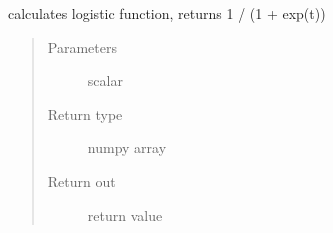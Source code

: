 \documentclass[letterpaper,10pt,english]{sphinxmanual}
\begin{document}

\begin{fulllineitems}
\label{\detokenize{regression:regression.phi}}
calculates logistic function, returns 1 / (1 + exp(\sphinxhyphen{}t))
\begin{quote}\begin{description}
\item[{Parameters}] \leavevmode
{} \textendash{} scalar

\item[{Return type}] \leavevmode
numpy array

\item[{Return out}] \leavevmode
return value

\end{description}\end{quote}

\end{fulllineitems}

\end{document}
